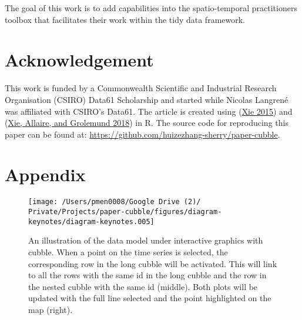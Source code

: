\documentclass{article}
\begin{document}
The goal of this work is to add capabilities into the spatio-temporal practitioners toolbox that facilitates their work within the tidy data framework.

\newpage

\hypertarget{acknowledgement}{%
\section{Acknowledgement}\label{acknowledgement}}

This work is funded by a Commonwealth Scientific and Industrial Research Organisation (CSIRO) Data61 Scholarship and started while Nicolas Langrené was affiliated with CSIRO's Data61. The article is created using  (\protect\hyperlink{ref-knitr}{Xie 2015}) and  (\protect\hyperlink{ref-rmarkdown}{Xie, Allaire, and Grolemund 2018}) in R. The source code for reproducing this paper can be found at: \url{https://github.com/huizezhang-sherry/paper-cubble}.

\hypertarget{appendix}{%
\section{Appendix}\label{appendix}}

\begin{figure}

{\centering \texttt{[image: /Users/pmen0008/Google Drive (2)/ Private/Projects/paper-cubble/figures/diagram-keynotes/diagram-keynotes.005]} 

}

\caption{An illustration of the data model under interactive graphics with cubble. When a point on the time series is selected, the corresponding row in the long cubble will be activated. This will link to all the rows with the same id in the long cubble and the row in the nested cubble with the same id (middle). Both plots will be updated with the full line selected and the point highlighted on the map (right).}\label{fig:illu-interactive-2}
\end{figure}

\newpage
\end{document}
